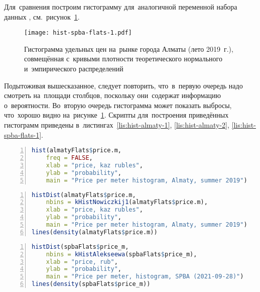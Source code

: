 \documentclass[]{scrartcl}
\begin{document}
Для~сравнения построим гистограмму для~аналогичной переменной набора данных \cite{ds:spba-flats-210928}, см.~рисунок~\ref{fig:hist-spba-flats-1}.

\begin{figure}[ht]
	\centering %
	\texttt{[image: hist-spba-flats-1.pdf]}
	\caption{Гистограмма удельных цен на~рынке города Алматы (лето 2019~г.), совмещённая с~кривыми плотности теоретического нормального и~эмпирического распределений}\label{fig:hist-spba-flats-1}
\end{figure}
Подытоживая вышесказанное, следует повторить, что~в~первую очередь надо смотреть на~площади столбцов, поскольку они~содержат информацию о~вероятности. Во~вторую очередь гистограмма может показать выбросы, что~хорошо видно на~рисунке~\ref{fig:hist-spba-flats-1}.
Скрипты для~построения приведённых гистограмм приведены в~листингах~\ref{lis:hist-almaty-1}, \ref{lis:hist-almaty-2}, \ref{lis:hist-spba-flats-1}.  

\begin{lstlisting}[float, caption = Построение простой гистограммы для~г.~Алматы, firstnumber=1, language = R, firstnumber=1, numbers=left, numberstyle=\tiny, stepnumber=2, numbersep=5pt, label= lis:hist-almaty-1]
hist(almatyFlats$price.m,
	freq = FALSE,
	xlab = "price, kaz rubles",
	ylab = "probability",
	main = "Price per meter histogram, Almaty, summer 2019")
\end{lstlisting}

\begin{lstlisting}[float, caption = Построение гистограммы\, совмещённой с~кривыми плотности теоретического нормального и~эмпирического распределений для~г.~Алматы, firstnumber=1, language = R, firstnumber=1, numbers=left, numberstyle=\tiny, stepnumber=2, numbersep=5pt, label= lis:hist-almaty-2]
histDist(almatyFlats$price.m,
 	nbins = kHistNowiczkij1(almatyFlats$price.m),
	xlab = "price, kaz rubles",
	ylab = "probability",
	main = "Price per meter histogram, Almaty, summer 2019")
lines(density(almatyFlats$price.m))
\end{lstlisting}

\begin{lstlisting}[float, caption = Построение гистограммы\, совмещённой с~кривыми плотности теоретического нормального и~эмпирического распределений для~городской агломерации Санкт-Петербург, firstnumber=1, language = R, firstnumber=1, numbers=left, numberstyle=\tiny, stepnumber=2, numbersep=5pt, label= lis:hist-spba-flats-1]
histDist(spbaFlats$price_m,
	nbins = kHistAlekseewa(spbaFlats$price_m),
	xlab = "price, rub",
	ylab = "probability",
	main = "Price per meter, histogram, SPBA (2021-09-28)")  
lines(density(spbaFlats$price_m))
\end{lstlisting}
\end{document}
